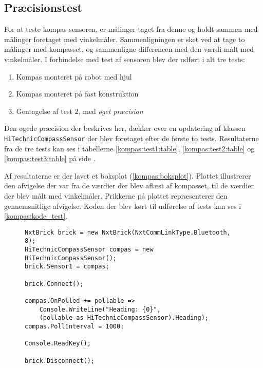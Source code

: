 \subsection{Præcisionstest}\label{kompas:precision}
For at teste kompas sensoren, er målinger taget fra denne og holdt sammen med målinger foretaget med vinkelmåler.
Sammenligningen er sket ved at tage to målinger med kompasset, og sammenligne differencen med den værdi målt med vinkelmåler.
I forbindelse med test af sensoren blev der udført i alt tre tests:
\begin{enumerate}
\item Kompas monteret på robot med hjul
\item Kompas monteret på fast konstruktion
\item Gentagelse af test 2, med \textit{øget præcision}
\end{enumerate}
Den øgede præcision der beskrives her, dækker over en opdatering af \mindsqualls klassen \lstinline[style=csharp]!HiTechnicCompassSensor! der blev foretaget efter de første to tests.
Resultaterne fra de tre tests kan ses i tabellerne \ref{kompas:test1:table}, \ref{kompas:test2:table} og \ref{kompas:test3:table} på side \pageref{kompas:test1:table}.

Af resultaterne er der lavet et boksplot (\cref{kompas:boksplot}).
Plottet illustrerer den afvigelse der var fra de værdier der blev aflæst af kompasset, til de værdier der blev målt med vinkelmåler.
Prikkerne på plottet repræsenterer den gennemsnitlige afvigelse.
Koden der blev kørt til udførelse af tests kan ses i \cref{kompas:kode_test}.

\begin{figure}[h]
\begin{lstlisting}[style=csharpsmall,caption={Kode brugt til test},label=kompas:kode_test,frame=single]
NxtBrick brick = new NxtBrick(NxtCommLinkType.Bluetooth, 8);
HiTechnicCompassSensor compas = new HiTechnicCompassSensor();
brick.Sensor1 = compas;

brick.Connect();

compas.OnPolled += pollable =>
	Console.WriteLine("Heading: {0}",
	(pollable as HiTechnicCompassSensor).Heading);
compas.PollInterval = 1000;

Console.ReadKey();

brick.Disconnect();
\end{lstlisting}
\end{figure}



